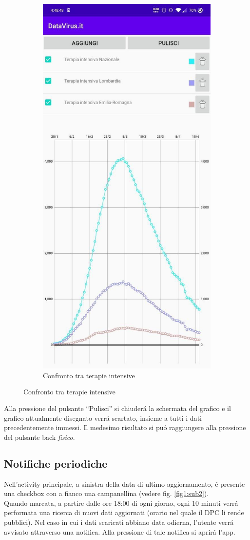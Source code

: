\documentclass{article}
\newcommand{\quotes}[1]{``#1''}
\begin{document}
\begin{figure}[h]
\begin{subfigure}{.5\textwidth}
        \includegraphics[width=.7\linewidth]{chart_ICU.jpg}
        \caption{Confronto tra terapie intensive}
        \label{fig5:sub2}
      \end{subfigure}
    \end{figure}
    Alla pressione del pulsante \quotes{Pulisci} si chiuderá la schermata del grafico e il grafico attualmente disegnato verrá scartato, insieme a tutti i dati precedentemente immessi.
    Il medesimo risultato si puó raggiungere alla pressione del pulsante back \emph{fisico}.

    \subsection{Notifiche periodiche}
    Nell'activity principale, a sinistra della data di ultimo aggiornamento, é presente una checkbox con a fianco una campanellina (vedere fig. \ref{fig1:sub2}).
    \\
    Quando marcata, a partire dalle ore 18:00 di ogni giorno, ogni 10 minuti verrá performata una ricerca di nuovi dati aggiornati (orario nel quale il DPC li rende pubblici).
    Nel caso in cui i dati scaricati abbiano data odierna, l'utente verrá avvisato attraverso una notifica. Alla pressione di tale notifica si aprirá l'app.
\end{document}
